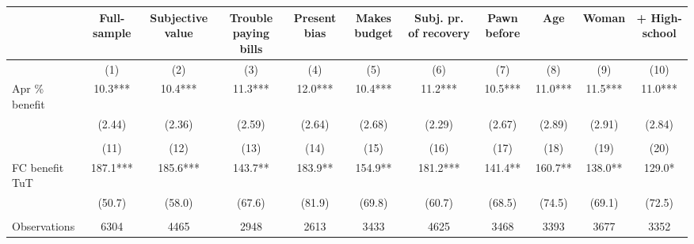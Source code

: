 \begin{tabular}{lcccccccccc}
\toprule
      & Full-sample & Subjective value & Trouble paying bills & Present bias & Makes budget & Subj. pr. of recovery & Pawn before & Age   & Woman & + High-school \\
\midrule
      & (1)   & (2)   & (3)   & (4)   & (5)   & (6)   & (7)   & (8)   & (9)   & (10) \\
\midrule
\midrule
Apr \% benefit & 10.3*** & 10.4*** & 11.3*** & 12.0*** & 10.4*** & 11.2*** & 10.5*** & 11.0*** & 11.5*** & 11.0*** \\
      & (2.44) & (2.36) & (2.59) & (2.64) & (2.68) & (2.29) & (2.67) & (2.89) & (2.91) & (2.84) \\
      &       &       &       &       &       &       &       &       &       &  \\
\midrule
      & (11)  & (12)  & (13)  & (14)  & (15)  & (16)  & (17)  & (18)  & (19)  & (20) \\
\midrule
\midrule
FC benefit TuT & 187.1*** & 185.6*** & 143.7** & 183.9** & 154.9** & 181.2*** & 141.4** & 160.7** & 138.0** & 129.0* \\
      & (50.7) & (58.0) & (67.6) & (81.9) & (69.8) & (60.7) & (68.5) & (74.5) & (69.1) & (72.5) \\
      &       &       &       &       &       &       &       &       &       &  \\
\midrule
Observations & 6304  & 4465  & 2948  & 2613  & 3433  & 4625  & 3468  & 3393  & 3677  & 3352 \\
\bottomrule
\bottomrule
\end{tabular}%
